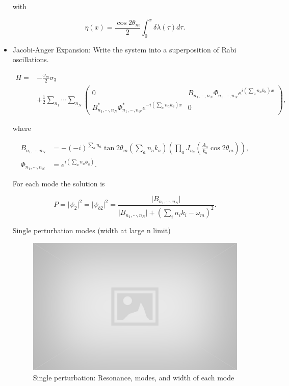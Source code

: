 \documentclass[%
preprint,
 amsmath,amssymb,
 aps,
]{revtex4-1}
\begin{document}
\begin{itemize}
with

\begin{equation}
 \eta(x) =  \frac{\cos 2\theta_m}{2} \int_0^x \delta\lambda (\tau) d\tau.
\end{equation}

    \item Jacobi-Anger Expansion: Write the system into a superposition of Rabi oscillations.
    
    
\begin{align}
H =& -\frac{\omega_m}{2} \sigma_3 \nonumber \\
&+ \frac{1}{2} \sum_{n_1} \cdots \sum_{n_N} \begin{pmatrix} 0 & B_{n_1,\cdots,n_N} \Phi_{n_1,\cdots, n_N} e^{i \left( \sum_{a} n_a k_a   \right)x} \\ B_{n_1,\cdots,n_N}^* \Phi_{n_1,\cdots, n_N}^* e^{-i \left( \sum_{a} n_a k_a   \right)x} & 0 \end{pmatrix},
\end{align}

where

\begin{align}
B_{n_1,\cdots,n_N} &= -(-i)^{\sum_a n_a} \tan 2\theta_m \left( \sum_a n_a k_a \right) \left( \prod_a J_{n_a}\left( \frac{A_a}{k_a}\cos 2\theta_m \right) \right),\\
\Phi_{n_1,\cdots, n_N} &= e^{i\left( \sum_a n_a \phi_a \right)}.
\end{align}


For each mode the solution is

\begin{equation}
P = \lvert \psi_2 \rvert^2 = \lvert \psi_{b2} \rvert^2 = \frac{\lvert B_{n_1,\cdots,n_N} \rvert}{\lvert B_{n_1,\cdots,n_N} \rvert + (\sum_i n_i k_i - \omega_m )^2}.
\end{equation}


Single perturbation modes (width at large n limit)

\begin{figure}[!htbp]
    \centering
    \includegraphics[width=\textwidth]{assets/placeholder.jpg}
    \caption{Single perturbation: Resonance, modes, and width of each mode}
    \label{fig:single-perturbation}
\end{figure}






\end{itemize}
\end{document}
